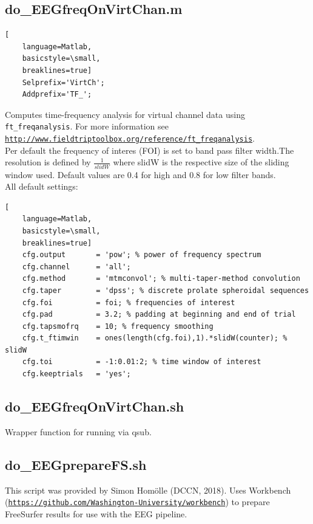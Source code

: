\documentclass[12pt,a4paper]{scrartcl}
\begin{document}
\subsection{do\_EEGfreqOnVirtChan.m}
\label{m:freqVirt}
\begin{lstlisting}[
    language=Matlab,
    basicstyle=\small,
    breaklines=true]
    Selprefix='VirtCh';
    Addprefix='TF_';
\end{lstlisting}
Computes time-frequency analysis for virtual channel data using \texttt{ft\_freqanalysis}. For more information see \href{http://www.fieldtriptoolbox.org/reference/ft\_freqanalysis}{\nolinkurl{http://www.fieldtriptoolbox.org/reference/ft\_freqanalysis}}.\\
\noindent Per default the frequency of interes (FOI) is set to band pass filter width.The resolution is defined by $\frac{1}{slidW}$ where slidW is the respective size of the sliding window used. Default values are 0.4 for high and 0.8 for low filter bands.\\

\noindent All default settings:
\begin{lstlisting}[
    language=Matlab,
    basicstyle=\small,
    breaklines=true]
    cfg.output       = 'pow'; % power of frequency spectrum
    cfg.channel      = 'all';
    cfg.method       = 'mtmconvol'; % multi-taper-method convolution
    cfg.taper        = 'dpss'; % discrete prolate spheroidal sequences
    cfg.foi          = foi; % frequencies of interest
    cfg.pad          = 3.2; % padding at beginning and end of trial
    cfg.tapsmofrq    = 10; % frequency smoothing
    cfg.t_ftimwin    = ones(length(cfg.foi),1).*slidW(counter); % slidW
    cfg.toi          = -1:0.01:2; % time window of interest
    cfg.keeptrials   = 'yes';
\end{lstlisting}

\subsection{do\_EEGfreqOnVirtChan.sh}
\label{sh:freqVirt}
Wrapper function for running \texttt{} via qsub.\\

\subsection{do\_EEGprepareFS.sh}
\label{sh:prepFS4EEG}
This script was provided by Simon Hom\"olle (DCCN, 2018). Uses Workbench (\href{https://github.com/Washington-University/workbench}{\nolinkurl{https://github.com/Washington-University/workbench}}) to prepare FreeSurfer results for use with the EEG pipeline.\\
\end{document}
